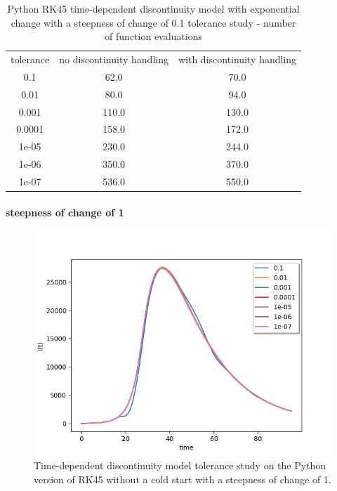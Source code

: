 \begin{table}[H]
\caption {Python RK45 time-dependent discontinuity model with exponential change with a steepness of change of 0.1 tolerance study - number of function evaluations} \label{tab:exp_time_tol_rk45_0_1} 
\begin{center}
\begin{tabular}{ c c c }
tolerance & no discontinuity handling & with discontinuity handling \\ 
0.1 & 62.0 & 70.0 \\
0.01 & 80.0 & 94.0 \\
0.001 & 110.0 & 130.0 \\
0.0001 & 158.0 & 172.0 \\
1e-05 & 230.0 & 244.0 \\
1e-06 & 350.0 & 370.0 \\
1e-07 & 536.0 & 550.0 \\
\end{tabular}
\end{center}
\end{table}

\paragraph{steepness of change of 1}

\begin{figure}[H]
\centering
\includegraphics[width=0.7\linewidth]{./figures/exp_time_tol_rk45_no_event_1}
\caption{Time-dependent discontinuity model tolerance study on the Python version of RK45 without a cold start with a steepness of change of 1.}
\label{fig:exp_time_tol_rk45_no_event_1}
\end{figure}

